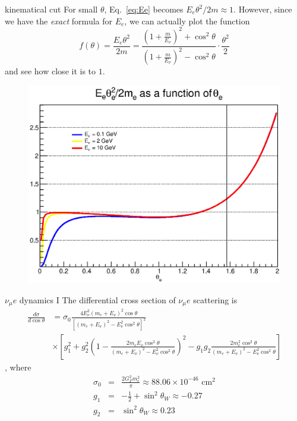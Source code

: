 \documentclass{beamer}
\begin{document}
\begin{frame}[allowframebreaks]{kinematical cut}
  For small $\theta$, Eq.~\eqref{eq:Ee} becomes $E_e\theta^2/2m\approx 1$. However, since we have the \emph{exact} formula for $E_e$, we can actually plot the function
\begin{equation} \label{eq:exact_cut_function}
  f(\theta)=\frac{E_e\theta^2}{2m}=\frac{\left( 1+\frac{m}{E_\nu} \right)^2+\cos^2\theta}{\left( 1+\frac{m}{E_\nu} \right)^2-\cos^2\theta}\cdot\frac{\theta^2}{2}
\end{equation}
and see how close it is to $1$.

\framebreak
\begin{figure}
\centering
  \includegraphics[width=\textwidth]{figures/cut_func_with_angle.eps}
\end{figure}

\end{frame}

\begin{frame}{$\nu_\mu e$ dynamics I}
\tiny
The differential cross section of $\nu_\mu e$ scattering is\footnotemark
\begin{equation}
  \begin{aligned}
  \frac{d\sigma}{d\cos\theta} & = \sigma_0 \frac{4E_\nu^2(m_e+E_\nu)^2\cos\theta}{\left[ (m_e+E_\nu)^2-E_\nu^2\cos^2\theta \right]^2} \\
  & \times \left[ g_1^2 + g_2^2\left( 1-\frac{2m_eE_\nu\cos^2\theta}{(m_e+E_\nu)^2-E_\nu^2\cos^2\theta} \right)^2 -g_1g_2
  \frac{2m_e^2\cos^2\theta}{(m_e+E_\nu)^2-E^2_\nu\cos^2\theta} \right]
  \end{aligned}
\end{equation}
, where
\begin{eqnarray*}
  \sigma_0 &=& \frac{2G_F^2m_e^2}{\pi}\approx 88.06\times 10^{-46} \text{ cm}^2 \\
  g_1 &=& -\frac{1}{2}+\sin^2\theta_W \approx -0.27 \\
  g_2 &=& \sin^2\theta_W \approx 0.23
\end{eqnarray*}
\end{frame}
\end{document}
